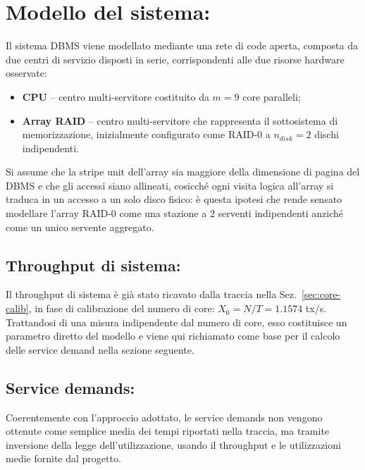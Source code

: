 \documentclass[11pt,a4paper]{article}
\begin{document}
\section{Modello del sistema:}

Il sistema DBMS viene modellato mediante una rete di code aperta, composta da due centri di
servizio disposti in serie, corrispondenti alle due risorse hardware osservate:
\begin{itemize}
\item \textbf{CPU} -- centro multi-servitore costituito da $m=9$ core paralleli;
\item \textbf{Array RAID} -- centro multi-servitore che rappresenta il sottosistema di
memorizzazione, inizialmente configurato come RAID-0 a $n_{disk}=2$ dischi indipendenti.
\end{itemize}
Si assume che la stripe unit dell'array sia maggiore della dimensione di pagina del DBMS e che
gli accessi siano allineati, cosicché ogni visita logica all'array si traduca in un accesso a un solo
disco fisico: è questa ipotesi che rende sensato modellare l'array RAID-0 come una stazione a
$2$ serventi indipendenti anziché come un unico servente aggregato.

\subsection{Throughput di sistema:}

Il throughput di sistema è già stato ricavato dalla traccia nella Sez.~\ref{sec:core-calib}, in
fase di calibrazione del numero di core: $X_0 = N/T = 1.1574$ tx/s. Trattandosi di una misura indipendente dal numero di core, esso costituisce un parametro diretto del modello e viene
qui richiamato come base per il calcolo delle service demand nella sezione seguente.

\subsection{Service demands:}

Coerentemente con l'approccio adottato, le service demands non vengono ottenute come semplice
media dei tempi riportati nella traccia, ma tramite inversione della legge dell'utilizzazione,
usando il throughput e le utilizzazioni medie fornite dal progetto.
\end{document}
